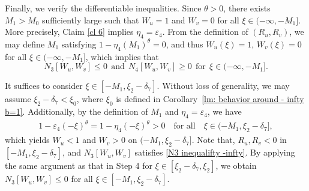 \documentclass[11pt,a4paper]{article}
\numberwithin{equation}{section}
\numberwithin{figure}{section}
\newcommand\bea{\begin{eqnarray}}
\newcommand\eea{\end{eqnarray}}
\begin{document}
Finally, we verify the differentiable inequalities.
Since $\theta>0$, there exists $M_1>M_0$ sufficiently large such that $W_u=1$ and $W_v=0$ for all $\xi\in(-\infty,-M_1]$.
More precisely, Claim \ref{cl 6} implies $\eta_4=\varepsilon_4$. From the definition of $(R_u,R_v)$, we may define $M_1$ satisfying $1-\eta_4(M_1)^{\theta}= 0$, and thus
$W_u(\xi)=1$, $W_v(\xi)=0$ for all $\xi\in(-\infty,-M_1]$, which implies that
$$N_3[W_u,W_v]\le 0\ \ \text{and}\ \ N_4[W_u,W_v]\ge 0\ \ \text{for}\ \ \xi\in(-\infty,-M_1].$$

It suffices to consider $\xi\in[-M_1,\xi_2-\delta_7]$. Without loss of generality, we may assume $\xi_2-\delta_7<\xi_0$,
where $\xi_0$ %
is defined in Corollary~\ref{lm: behavior around - infty b=1}. Additionally, %
by the definition of $M_1$ and $\eta_4=\varepsilon_4$, we have
\bea\label{eta 4 epsilon 4}
1-\varepsilon_4(-\xi)^{\theta}=1-\eta_4(-\xi)^{\theta}> 0\quad\text{for all}\quad \xi\in(-M_1,\xi_2-\delta_7],
\eea
which yields $W_u<1$ and $W_v>0$ on $(-M_1,\xi_2-\delta_7]$.
Note that, $R_u,R_v<0$ in $[-M_1,\xi_2-\delta_7]$, and $N_3[W_u,W_v]$ satisfies \eqref{N3 inequalifty -infty}.
By applying the same argument as that in Step 4 for $\xi\in[\xi_2-\delta_7,\xi_2]$, we obtain
$N_3[W_u,W_v]\le 0$ for all $\xi\in[-M_1,\xi_2-\delta_7]$.
\end{document}
